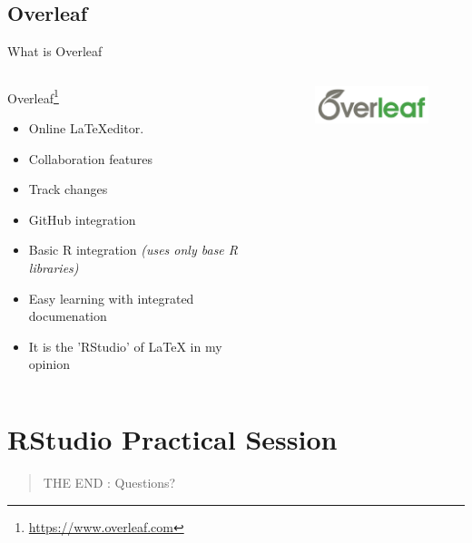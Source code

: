 \documentclass[fleqn]{beamer}\usepackage[]{graphicx}\usepackage[]{color}
\begin{document}
\subsection{Overleaf}
\begin{frame}{What is Overleaf}
\begin{columns}[T] %
\begin{column}{.48\textwidth}
Overleaf\footnote{\href{https://www.overleaf.com/edu/nottingham}{https://www.overleaf.com}}
\begin{itemize}
  \item Online \LaTeX editor.
  \item Collaboration features
  \item Track changes
  \item GitHub integration
  \item Basic R integration \textit{(uses only base R libraries)}
  \item Easy learning with integrated documenation
  \item It is the 'RStudio' of \LaTeX{} in my opinion
\end{itemize}
\end{column}%
\hfill%
\begin{column}{.48\textwidth}
\begin{figure}[htp]
    \centering
    \includegraphics[width=4cm]{images/overleaf_wide_colour_light_bg}
\end{figure}
\end{column}%
\end{columns}
\end{frame}

\section{RStudio Practical Session}
\begin{frame}
\centering
\begin{quote}
THE END : Questions?
\end{quote}

\end{frame}
\end{document}
